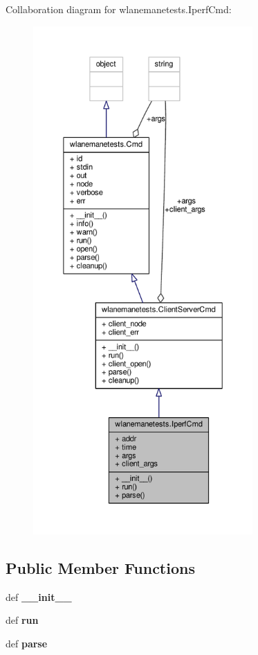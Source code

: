 Collaboration diagram for wlanemanetests.\+Iperf\+Cmd\+:
\nopagebreak
\begin{figure}[H]
\begin{center}
\leavevmode
\includegraphics[height=550pt]{classwlanemanetests_1_1_iperf_cmd__coll__graph}
\end{center}
\end{figure}
\subsection*{Public Member Functions}
\begin{DoxyCompactItemize}
\item 
\hypertarget{classwlanemanetests_1_1_iperf_cmd_a0151c6710401e9e87289c45b4bb2e4b0}{def {\bfseries \+\_\+\+\_\+init\+\_\+\+\_\+}}\label{classwlanemanetests_1_1_iperf_cmd_a0151c6710401e9e87289c45b4bb2e4b0}

\item 
\hypertarget{classwlanemanetests_1_1_iperf_cmd_aaff1a2ecc7a917cba2c03efe736ca3ab}{def {\bfseries run}}\label{classwlanemanetests_1_1_iperf_cmd_aaff1a2ecc7a917cba2c03efe736ca3ab}

\item 
\hypertarget{classwlanemanetests_1_1_iperf_cmd_a6755a698408c72beaa7c16c4bd2b6c56}{def {\bfseries parse}}\label{classwlanemanetests_1_1_iperf_cmd_a6755a698408c72beaa7c16c4bd2b6c56}

\end{DoxyCompactItemize}
